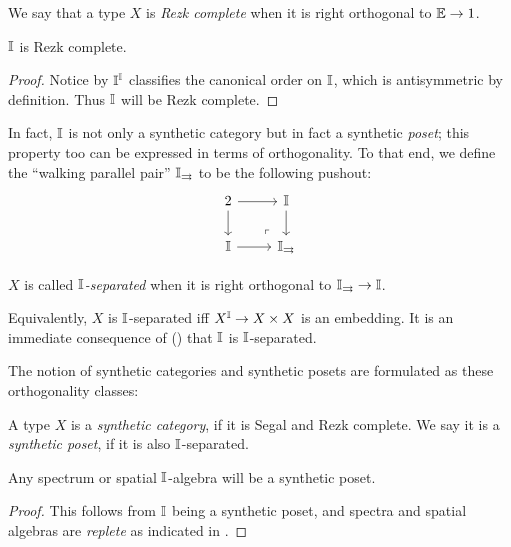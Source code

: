 \begin{definition}
  We say that a type $X$ is \emph{Rezk complete} when it is right orthogonal to $\mathbb{E} \to 1$.
\end{definition}

\begin{proposition}[\AxiomSQCP]
  $\mathbb{I}$ is Rezk complete.
\end{proposition}
\begin{proof}
  Notice by  $\mathbb{I}^{\mathbb{I}}$ classifies the canonical order on $\mathbb{I}$, which is antisymmetric by definition. Thus $\mathbb{I}$ will be Rezk complete.
\end{proof}

In fact, $\mathbb{I}$ is not only a synthetic category but in fact a synthetic \emph{poset}; this property too can be expressed in terms of orthogonality. To that end, we define the ``walking parallel pair'' $\mathbb{I}_{\rightrightarrows}$ to be the following pushout:
\[
\begin{tikzcd}
  2 \ar[r] \ar[d] & \I \ar[d] \\ 
  \I \ar[r] & \I_{\rightrightarrows}
  \arrow["\lrcorner"{anchor=center, pos=0.125, rotate=180}, draw=none, from=2-2, to=1-1]
\end{tikzcd}
\]

\begin{definition}
  $X$ is called \emph{$\mathbb{I}$-separated} when it is right orthogonal to $\mathbb{I}_{\rightrightarrows} \to \mathbb{I}$.
\end{definition}

Equivalently, $X$ is $\mathbb{I}$-separated iff $X^{\mathbb{I}} \to X \times X$ is an embedding. It is an immediate consequence of (\AxiomSQCP) that $\mathbb{I}$ is $\mathbb{I}$-separated.

The notion of synthetic categories and synthetic posets are formulated as these orthogonality classes:

\begin{definition}
  A type $X$ is a \emph{synthetic category}, if it is Segal and Rezk complete. We say it is a \emph{synthetic poset}, if it is also $\mathbb{I}$-separated.
\end{definition}

\begin{theorem}[\AxiomSQCF]\label{thm:soberposet}
  Any spectrum or spatial $\mathbb{I}$-algebra will be a synthetic poset.
\end{theorem}
\begin{proof}
  This follows from $\mathbb{I}$ being a synthetic poset, and spectra and spatial algebras are \emph{replete} as indicated in .
\end{proof}

